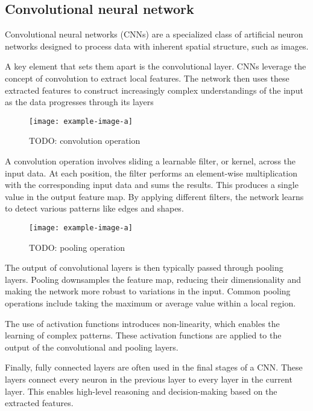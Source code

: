 \subsection{Convolutional neural network}
Convolutional neural networks (CNNs) are a specialized class of artificial neuron networks designed to process data with inherent spatial structure, such as images.

A key element that sets them apart is the convolutional layer.
CNNs leverage the concept of convolution to extract local features.
The network then uses these extracted features to construct increasingly complex understandings of the input as the data progresses through its layers

\begin{figure}[hbtp]
    \centering    
    \texttt{[image: example-image-a]}
    \caption{TODO: convolution operation}
\end{figure}

A convolution operation involves sliding a learnable filter, or kernel, across the input data.
At each position, the filter performs an element-wise multiplication with the corresponding input data and sums the results.
This produces a single value in the output feature map.
By applying different filters, the network learns to detect various patterns like edges and shapes.

\begin{figure}[hbtp]
    \centering    
    \texttt{[image: example-image-a]}
    \caption{TODO: pooling operation}
\end{figure}

The output of convolutional layers is then typically passed through pooling layers.
Pooling downsamples the feature map, reducing their dimensionality and making the network more robust to variations in the input.
Common pooling operations include taking the maximum or average value within a local region. %

The use of activation functions introduces non-linearity, which enables the learning of complex patterns.
These activation functions are applied to the output of the convolutional and pooling layers.

Finally, fully connected layers are often used in the final stages of a CNN.
These layers connect every neuron in the previous layer to every layer in the current layer.
This enables high-level reasoning and decision-making based on the extracted features.

